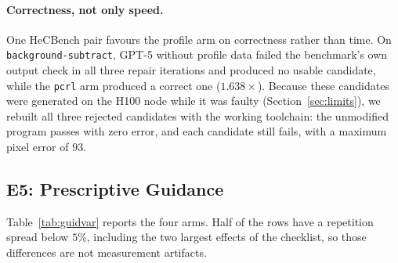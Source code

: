 \paragraph{Correctness, not only speed.}
One HeCBench pair favours the profile arm on correctness rather than time. On
\texttt{background-subtract}, GPT-5 without profile data failed the benchmark's own output check in
all three repair iterations and produced no usable candidate, while the \texttt{pcrl} arm produced a
correct one ($1.638\times$). Because these candidates were generated on the H100 node while it was
faulty (Section~\ref{sec:limits}), we rebuilt all three rejected candidates with the working toolchain:
the unmodified program passes with zero error, and each candidate still fails, with a maximum pixel
error of $93$.

\subsection{E5: Prescriptive Guidance}
\label{sec:guidvar}
Table~\ref{tab:guidvar} reports the four arms. Half of the rows have a repetition spread below $5\%$,
including the two largest effects of the checklist, so those differences are not measurement
artifacts.


